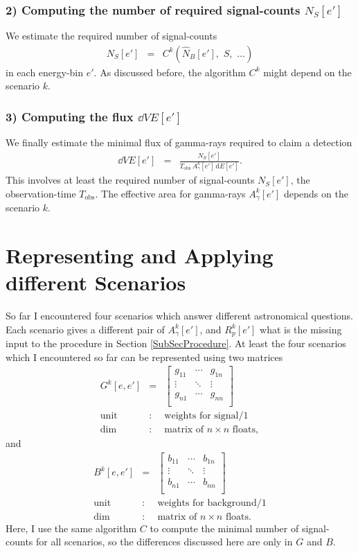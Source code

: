 \documentclass{article}%
\begin{document}
\subsubsection*{2) Computing the number of required signal-counts $N_S[e']$}
%
We estimate the required number of signal-counts
\begin{eqnarray}
N_S[e'] &=& C^k(\hat{N}_B[e'],\,\,S,\,\,\dots)
\end{eqnarray}
in each energy-bin $e'$. As discussed before, the algorithm $C^k$ might depend on the scenario $k$.
%
\subsubsection*{3) Computing the flux $\dd{V}{E}[e']$}
%
We finally estimate the minimal flux of gamma-rays required to claim a detection
%
\begin{eqnarray}
\dd{V}{E}[e'] &=& \frac{N_S[e']}{{T_\text{obs}}\,{A^k_\gamma}[e']\,\text{d}E[e']}.
\end{eqnarray}
%
This involves at least the required number of signal-counts $N_S[e']$, the observation-time $T_\text{obs}$.
%
The effective area for gamma-rays $A^k_\gamma[e']$ depends on the scenario $k$.
%
\section{Representing and Applying different Scenarios}
%
So far I encountered four scenarios which answer different astronomical questions.
%
Each scenario gives a different pair of $A^k_\gamma[e']$, and $R^k_p[e']$ what is the missing input to the procedure in Section \ref{SubSecProcedure}.
%
At least the four scenarios which I encountered so far can be represented using two matrices
%
\begin{eqnarray*}
G^k[e, e'] &=&
  \left[ {\begin{array}{ccc}
    g_{11} & \cdots & g_{1n}\\
    \vdots & \ddots & \vdots\\
    g_{n1} & \cdots & g_{nn}\\
  \end{array} } \right]\\
\text{unit} &:& \text{weights for signal}/1\\
\text{dim} &:& \text{matrix of}\,\,n \times n \,\,\text{floats},
\end{eqnarray*}
%
and
%
\begin{eqnarray*}
B^k[e, e'] &=&
  \left[ {\begin{array}{cccc}
    b_{11} & \cdots & b_{1n}\\
    \vdots & \ddots & \vdots\\
    b_{n1} & \cdots & b_{nn}\\
  \end{array} } \right]\\
\text{unit} &:& \text{weights for background}/1\\
\text{dim} &:& \text{matrix of}\,\,n \times n \,\,\text{floats}.
\end{eqnarray*}
%
Here, I use the same algorithm $C$ to compute the minimal number of signal-counts for all scenarios, so the differences discussed here are only in $G$ and $B$.
%
\end{document}
